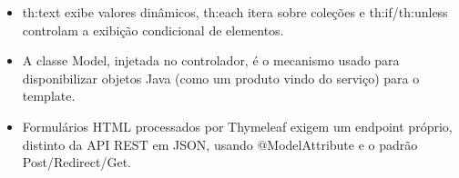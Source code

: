 \begin{itemize}
  \item th:text exibe valores dinâmicos, th:each itera sobre coleções e th:if/th:unless controlam a exibição condicional de elementos.
\end{itemize}

\begin{itemize}
  \item A classe Model, injetada no controlador, é o mecanismo usado para disponibilizar objetos Java (como um produto vindo do serviço) para o template.
\end{itemize}

\begin{itemize}
  \item Formulários HTML processados por Thymeleaf exigem um endpoint próprio, distinto da API REST em JSON, usando @ModelAttribute e o padrão Post/Redirect/Get.
\end{itemize}
